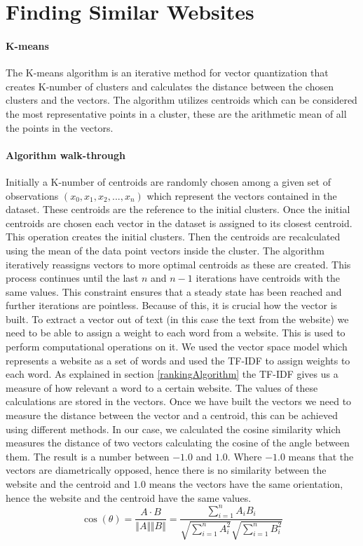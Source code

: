 \section{Finding Similar Websites}
\paragraph{K-means}
The K-means algorithm is an iterative method for vector quantization that creates K-number of clusters and calculates the distance between the chosen clusters and the vectors. 
The algorithm utilizes centroids which can be considered the most representative points in a cluster, these are the arithmetic mean of all the points in the vectors.
\paragraph{Algorithm walk-through}
Initially a K-number of centroids are randomly chosen among a given set of observations $(x_0,x_1,x_2,...,x_n)$ which represent the vectors contained in the dataset. These centroids are the reference to the initial clusters. Once the initial centroids are chosen each vector in the dataset is assigned to its closest centroid. This operation creates the initial clusters. Then the centroids are recalculated using the mean of the data point vectors inside the cluster. 
The algorithm iteratively reassigns vectors to more optimal centroids as these are created.\cite{wikiKmeans}
This process continues until the last $n$ and $n-1$ iterations have centroids with the same values. 
This constraint ensures that a steady state has been reached and further iterations are pointless.
Because of this, it is crucial how the vector is built. To extract a vector out of text (in this case the text from the website) we need to be able to assign a weight to each word from a website. This is used to perform computational operations on it. We used the vector space model which represents a website as a set of words and used the TF-IDF to assign weights to each word. As explained in section \ref{rankingAlgorithm} the TF-IDF gives us a measure of how  relevant a word to a certain website. The values of these calculations are stored in the vectors.
Once we have built the vectors we need to measure the distance between the vector and a centroid, this can be achieved using different methods. In our case, we calculated the cosine similarity which measures the distance of two vectors calculating the cosine of the angle between them. The result is a number between $-1.0$ and $1.0$. Where $-1.0$ means that the vectors are diametrically opposed, hence there is no similarity between the website and the centroid and $1.0$ means the vectors have the same orientation, hence the website and the centroid have the same values.\cite{wikiVector}
$$
\cos(\theta) = \frac{A \cdot B}{\Vert A \Vert \Vert B \Vert} = \frac{\sum_{i=1}^n A_iB_i}{\sqrt{\sum_{i=1}^n A_i^2}{\sqrt{\sum_{i=1}^n B_i^2}}}
$$
